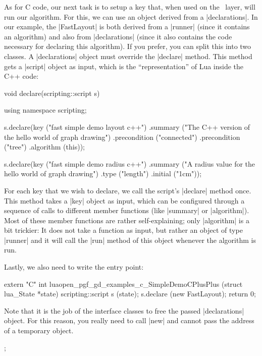 As for C code, our next task is to setup a key that, when used on the
\tikzname\ layer, will run our algorithm. For this, we can use an
object derived from a |declarations|. In our example, the |FastLayout|
is both derived from a |runner| (since it contains an algorithm) and
also from |declarations| (since it also contains the code necessary for
declaring this algorithm). If you prefer, you can split this into two
classes. A |declarations| object must override the |declare|
method. This method gets a |script| object as input, which is the
``representation'' of Lua inside the C++ code:

\begin{codeexample}
void declare(scripting::script s) {
  using namespace scripting;

  s.declare(key ("fast simple demo layout c++")
            .summary ("The C++ version of the hello world of graph drawing")
            .precondition ("connected")
            .precondition ("tree")
            .algorithm (this));
    
  s.declare(key ("fast simple demo radius c++")
            .summary ("A radius value for the hello world of graph drawing")
            .type ("length")
            .initial ("1cm"));
}
\end{codeexample}

For each key that we wish to declare, we call the script's |declare|
method once. This method takes a |key| object as input, which can be
configured through a sequence of calls to different member functions
(like |summary| or |algorithm|). Most of these member functions are
rather self-explaining; only |algorithm| is a bit trickier: It does
not take a function as input, but rather an object of type |runner|
and it will call the |run| method of this object whenever the
algorithm is run.

Lastly, we also need to write the entry point:

\begin{codeexample}
extern "C" int luaopen_pgf_gd_examples_c_SimpleDemoCPlusPlus (struct lua_State *state) {
  scripting::script s (state);
  s.declare (new FastLayout);
  return 0;
}
\end{codeexample}

Note that it is the job of the interface classes to free the passed
|declarations| object. For this reason, you really need to call |new|
and cannot pass the address of a temporary object.


\begin{codeexample}[]
\tikz {};
\end{codeexample}

